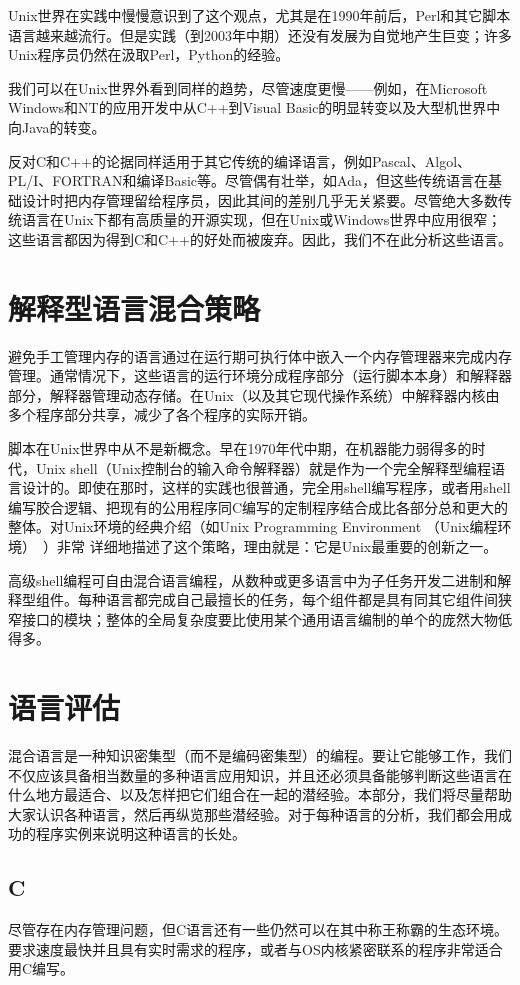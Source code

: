 \documentclass[12pt,oneside]{ctexbook}
\begin{document}
\begin{common-format}
Unix世界在实践中慢慢意识到了这个观点，尤其是在1990年前后，Perl和其它脚本语言越来越流行。但是实践（到2003年中期）还没有发展为自觉地产生巨变；许多Unix程序员仍然在汲取Perl，Python的经验。

我们可以在Unix世界外看到同样的趋势，尽管速度更慢——例如，在Microsoft Windows和NT的应用开发中从C++到Visual Basic的明显转变以及大型机世界中向Java的转变。

反对C和C++的论据同样适用于其它传统的编译语言，例如Pascal、Algol、PL/I、FORTRAN和编译Basic等。尽管偶有壮举，如Ada，但这些传统语言在基础设计时把内存管理留给程序员，因此其间的差别几乎无关紧要。尽管绝大多数传统语言在Unix下都有高质量的开源实现，但在Unix或Windows世界中应用很窄；这些语言都因为得到C和C++的好处而被废弃。因此，我们不在此分析这些语言。


\section{解释型语言混合策略}
避免手工管理内存的语言通过在运行期可执行体中嵌入一个内存管理器来完成内存管理。通常情况下，这些语言的运行环境分成程序部分（运行脚本本身）和解释器部分，解释器管理动态存储。在Unix（以及其它现代操作系统）中解释器内核由多个程序部分共享，减少了各个程序的实际开销。

脚本在Unix世界中从不是新概念。早在1970年代中期，在机器能力弱得多的时代，Unix shell（Unix控制台的输入命令解释器）就是作为一个完全解释型编程语言设计的。即使在那时，这样的实践也很普通，完全用shell编写程序，或者用shell编写胶合逻辑、把现有的公用程序同C编写的定制程序结合成比各部分总和更大的整体。对Unix环境的经典介绍（如Unix Programming Environment （Unix编程环境）~\cite{Kernighan-Pike84}）非常
详细地描述了这个策略，理由就是：它是Unix最重要的创新之一。

高级shell编程可自由混合语言编程，从数种或更多语言中为子任务开发二进制和解释型组件。每种语言都完成自己最擅长的任务，每个组件都是具有同其它组件间狭窄接口的模块；整体的全局复杂度要比使用某个通用语言编制的单个的庞然大物低得多。

\section{语言评估}
混合语言是一种知识密集型（而不是编码密集型）的编程。要让它能够工作，我们不仅应该具备相当数量的多种语言应用知识，并且还必须具备能够判断这些语言在什么地方最适合、以及怎样把它们组合在一起的潜经验。本部分，我们将尽量帮助大家认识各种语言，然后再纵览那些潜经验。对于每种语言的分析，我们都会用成功的程序实例来说明这种语言的长处。

\subsection{C}
尽管存在内存管理问题，但C语言还有一些仍然可以在其中称王称霸的生态环境。要求速度最快并且具有实时需求的程序，或者与OS内核紧密联系的程序非常适合用C编写。


\end{common-format}
\end{document}
